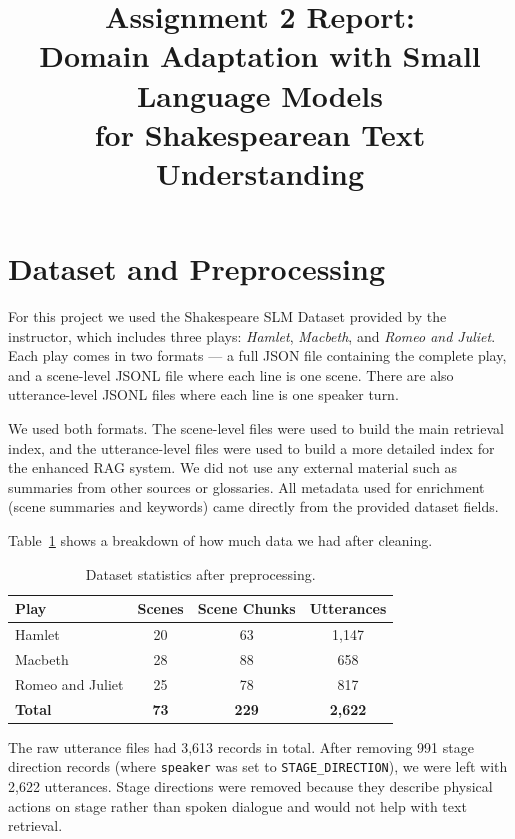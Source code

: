 \documentclass[10pt,conference]{IEEEtran}
\title{
Assignment 2 Report:\\
Domain Adaptation with Small Language Models\\
for Shakespearean Text Understanding
}
\author{
\IEEEauthorblockN{
Group Number: 
}
\IEEEauthorblockA{
CSCI433/933 Machine Learning Algorithms and Applications\\
}
}
\begin{document}
\maketitle

\section{Dataset and Preprocessing}
\label{sec:dataset}

For this project we used the Shakespeare SLM Dataset provided by the
instructor, which includes three plays: \textit{Hamlet},
\textit{Macbeth}, and \textit{Romeo and Juliet}. Each play comes in
two formats --- a full JSON file containing the complete play, and a
scene-level JSONL file where each line is one scene. There are also
utterance-level JSONL files where each line is one speaker turn.

We used both formats. The scene-level files were used to build the
main retrieval index, and the utterance-level files were used to build
a more detailed index for the enhanced RAG system. We did not use any
external material such as summaries from other sources or glossaries.
All metadata used for enrichment (scene summaries and keywords) came
directly from the provided dataset fields.

Table~\ref{tab:dataset-stats} shows a breakdown of how much data we
had after cleaning.

\begin{table}[ht]
\centering
\caption{Dataset statistics after preprocessing.}
\label{tab:dataset-stats}
\begin{tabular}{lccc}
\toprule
Play & Scenes & Scene Chunks & Utterances \\
\midrule
Hamlet           & 20 & 63  & 1,147 \\
Macbeth          & 28 & 88  & 658   \\
Romeo and Juliet & 25 & 78  & 817   \\
\midrule
\textbf{Total} & \textbf{73} & \textbf{229} & \textbf{2,622} \\
\bottomrule
\end{tabular}
\end{table}

The raw utterance files had 3,613 records in total. After removing
991 stage direction records (where \texttt{speaker} was set to
\texttt{STAGE\_DIRECTION}), we were left with 2,622 utterances. Stage
directions were removed because they describe physical actions on stage
rather than spoken dialogue and would not help with text retrieval.
\end{document}
